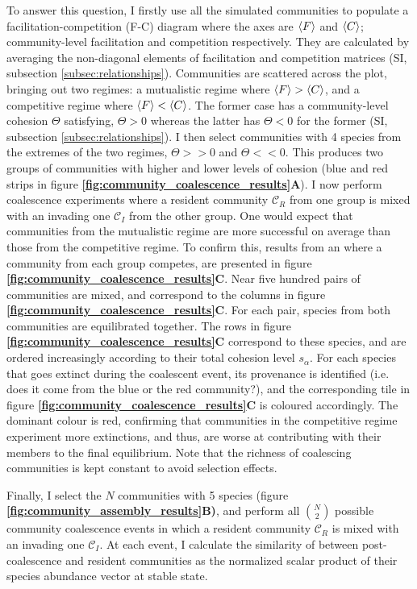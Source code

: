 \documentclass[titlepage,11pt]{article}
\begin{document}
\begin{linenumbers}
			To answer this question, I firstly use all the simulated communities to populate a facilitation-competition (F-C) diagram where the axes are  $ \braket{F} $ and $ \braket{C}$; community-level facilitation and competition respectively. They are calculated by averaging the non-diagonal elements of facilitation and competition matrices (SI, subsection \ref{subsec:relationships}). Communities are scattered across the plot, bringing out two regimes: a mutualistic regime where $  \braket{F} > \braket{C} $, and a competitive regime where $ \braket{F} < \braket{C} $. The former case has a community-level cohesion $ \Theta $ satisfying, $  \Theta > 0$ whereas the latter has $ \Theta < 0 $ for the former (SI, subsection \ref{subsec:relationships}). I then select communities with 4 species from the extremes of the two regimes, $ \Theta >> 0 $ and $ \Theta << 0 $. This produces two groups of communities with higher and lower levels of cohesion (blue and red strips in figure \textbf{\ref{fig:community_coalescence_results}A}). I now perform coalescence experiments where a resident community $\mathcal{C}_R$  from one group is mixed with an invading one $ \mathcal{C}_I $ from the other group. One would expect that communities from the mutualistic regime are more successful on average than those from the competitive regime. To confirm this, results from an  where a community from each group competes, are presented in figure \textbf{\ref{fig:community_coalescence_results}C}. Near five hundred pairs of communities are mixed, and correspond to the columns in figure  \textbf{\ref{fig:community_coalescence_results}C}. For each pair, species from both communities are equilibrated together. The rows in figure \textbf{\ref{fig:community_coalescence_results}C} correspond to these species, and are ordered increasingly according to their total cohesion level $ s_{\alpha} $. For each species that goes extinct during the coalescent event, its provenance is identified (i.e. does it come from the blue or the red community?), and the corresponding tile in figure \textbf{\ref{fig:community_coalescence_results}C} is coloured accordingly. The dominant colour is red, confirming that communities in the competitive regime experiment more extinctions, and thus, are worse at contributing with their members to the final equilibrium. Note that the richness of coalescing communities is kept constant to avoid selection effects.\par
			Finally, I select the $ N $ communities with 5 species (figure \textbf{\ref{fig:community_assembly_results}B)}, and perform  all $ {N}\choose{2} $ possible community coalescence events in which a resident community $\mathcal{C}_R$ is mixed with an invading one $ \mathcal{C}_I $. At each event, I calculate the similarity of between post-coalescence and resident communities as the normalized scalar product of their species abundance vector at stable state.

\end{linenumbers}
\end{document}

